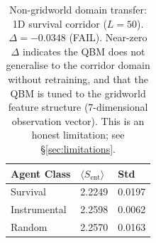 \begin{table}[t]
\centering
\caption{Non-gridworld domain transfer: 1D survival corridor ($L=50$).
$\Delta = -0.0348$ (FAIL). Near-zero $\Delta$ indicates the QBM does not generalise
to the corridor domain without retraining, and that the QBM is tuned
to the gridworld feature structure (7-dimensional observation vector).
This is an honest limitation; see \S\ref{sec:limitations}.}
\label{tab:non_gridworld}
\begin{tabular}{lll}
\toprule
Agent Class & $\langle S_\mathrm{ent}\rangle$ & Std \\
\midrule
Survival & 2.2249 & 0.0197 \\
Instrumental & 2.2598 & 0.0062 \\
Random & 2.2570 & 0.0163 \\
\bottomrule
\end{tabular}
\end{table}
